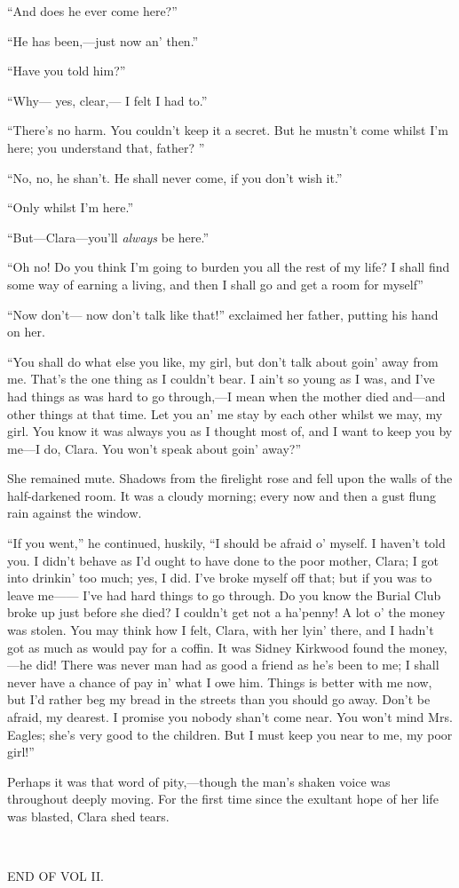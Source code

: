 ``And does he ever come here?''

{\protect\hypertarget{304}{}{}}``He has been,---just now an' then.''

``Have you told him?''

``Why--- yes, clear,--- I felt I had to.''

``There's no harm. You couldn't keep it a secret. But he mustn't come
whilst I'm here; you understand that, father? ''

``No, no, he shan't. He shall never come, if you don't wish it.''

``Only whilst I'm here.''

``But---Clara---you'll \emph{always} be here.''

``Oh no! Do you think I'm going to burden you all the rest of my life? I
shall find some way of earning a living, and then I shall go and get a
room for myself''

``Now don't--- now don't talk like that!'' exclaimed her father, putting
his hand on her.

``You shall do what else you like, my girl, but don't talk about goin'
away from me. That's the one thing as I couldn't bear. I ain't so young
as I was, and I've had things as was hard to go through,---I mean when
the mother died and---and other things at that time. Let you an' me stay
by each other whilst we may, my girl. You know it was
{\protect\hypertarget{305}{}{}}always you as I thought most of, and I
want to keep you by me---I do, Clara. You won't speak about goin'
away?''

She remained mute. Shadows from the firelight rose and fell upon the
walls of the half-darkened room. It was a cloudy morning; every now and
then a gust flung rain against the window.

``If you went,'' he continued, huskily, ``I should be afraid o' myself.
I haven't told you. I didn't behave as I'd ought to have done to the
poor mother, Clara; I got into drinkin' too much; yes, I did. I've broke
myself off that; but if you was to leave me{{------}} I've had hard
things to go through. Do you know the Burial Club broke up just before
she died? I couldn't get not a ha'penny! A lot o' the money was stolen.
You may think how I felt, Clara, with her lyin' there, and I hadn't got
as much as would pay for a coffin. It was Sidney Kirkwood found the
money,---he did! There was never man had as good a friend as he's been
to me; I shall never have a chance of pay in' what I owe
{\protect\hypertarget{306}{}{}}him. Things is better with me now, but
I'd rather beg my bread in the streets than you should go away. Don't be
afraid, my dearest. I promise you nobody shan't come near. You won't
mind Mrs. Eagles; she's very good to the children. But I must keep you
near to me, my poor girl!''

Perhaps it was that word of pity,---though the man's shaken voice was
throughout deeply moving. For the first time since the exultant hope of
her life was blasted, Clara shed tears.

~

END OF VOL II.
